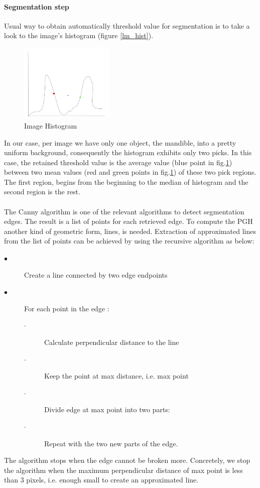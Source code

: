 \documentclass[twoside,twocolumn,10pt]{article}
\begin{document}
\paragraph{Segmentation step}
Usual way to obtain automatically threshold value for 
segmentation is to take a look to the image's histogram (figure
\ref{lm_hist}). 
\begin{figure}
\centering
\includegraphics[width=4.5cm]{./images/hist}
\caption{\small{Image Histogram}}
\label{lm_hist1}
\end{figure}
In our case, per image we have only one object, the mandible,  into a
pretty uniform background, consequently the histogram exhibits only two
picks. In this case, the retained threshold value is the average 
value (blue point in fig.\ref{lm_hist1}) between two mean values (red and
green points in fig.\ref{lm_hist1}) of these two pick regions. The first region,
begins from the beginning to the median of histogram and the second region is the rest.\\
\\
The Canny algorithm \cite{canny1986computational} is one of the
relevant algorithms to detect segmentation edges. The result is a list
of points for each retrieved edge. To compute the PGH another kind of
geometric form, lines, is needed. Extraction of approximated lines
from the list of points can be achieved by using the
recursive algorithm \cite{thacker1995assessing} as below:
{\small{\begin{description}
    \item[$\bullet$] Create a line connected by two edge endpoints
    \item[$\bullet$] For each point in the edge :
      \begin{description}
      \item[$\cdot$] Calculate perpendicular distance to the line
      \item[$\cdot$] Keep the point at  max distance, i.e. max point
      \item[$\cdot$] Divide edge at max point into two parts:
      \item[$\cdot$] Repeat with the two new parts of the edge.
  \end{description}
  \end{description}
 } }
The algorithm stops when the edge cannot be broken more. Concretely,
we stop the algorithm when the maximum perpendicular distance of max
point is less than $3$ pixels, i.e. enough small to create an approximated line.
\end{document}

